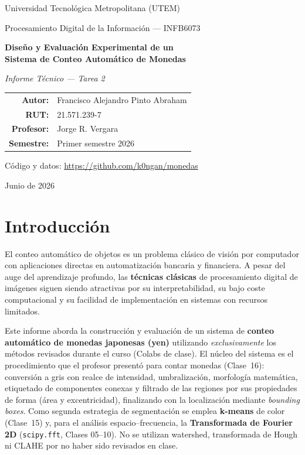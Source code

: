 \documentclass[11pt,a4paper]{article}
\newcommand{\code}[1]{\texttt{#1}}
\begin{document}
\begin{titlepage}
\centering
\vspace*{1.5cm}
{\large Universidad Tecnológica Metropolitana (UTEM)\par}
{\large Procesamiento Digital de la Información --- INFB6073\par}
\vspace{2.2cm}
{\Huge\bfseries Diseño y Evaluación Experimental de un\\[4pt] Sistema de Conteo Automático de Monedas\par}
\vspace{0.6cm}
{\large\itshape Informe Técnico --- Tarea 2\par}
\vspace{2.5cm}
\begin{tabular}{rl}
\textbf{Autor:} & Francisco Alejandro Pinto Abraham\\
\textbf{RUT:} & 21.571.239-7\\
\textbf{Profesor:} & Jorge R. Vergara\\
\textbf{Semestre:} & Primer semestre 2026\\
\end{tabular}
\vfill
{\small Código y datos: \url{https://github.com/k0ngan/monedas}\par}
{\small Junio de 2026\par}
\end{titlepage}

\section{Introducción}

El conteo automático de objetos es un problema clásico de visión por computador con aplicaciones directas
en automatización bancaria y financiera. A pesar del auge del aprendizaje profundo, las \textbf{técnicas
clásicas} de procesamiento digital de imágenes siguen siendo atractivas por su interpretabilidad, su bajo
coste computacional y su facilidad de implementación en sistemas con recursos limitados.

Este informe aborda la construcción y evaluación de un sistema de \textbf{conteo automático de monedas
japonesas (yen)} utilizando \emph{exclusivamente} los métodos revisados durante el curso (Colabs de
clase). El núcleo del sistema es el procedimiento que el profesor presentó para contar monedas (Clase~16):
conversión a gris con realce de intensidad, umbralización, morfología matemática, etiquetado de
componentes conexas y filtrado de las regiones por sus propiedades de forma (área y excentricidad),
finalizando con la localización mediante \emph{bounding boxes}. Como segunda estrategia de segmentación se
emplea \textbf{k-means} de color (Clase~15) y, para el análisis espacio--frecuencia, la \textbf{Transformada
de Fourier 2D} (\code{scipy.fft}, Clases 05--10). No se utilizan watershed, transformada de Hough ni CLAHE
por no haber sido revisados en clase.
\end{document}
